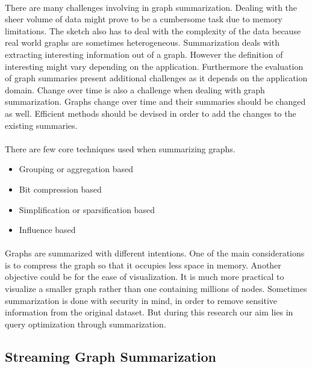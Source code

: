\paragraph{}
There are many challenges involving in graph summarization. Dealing with the sheer volume of data might prove to be a cumbersome task due to memory limitations. The sketch also has to deal with the complexity of the data because real world graphs are sometimes heterogeneous. Summarization deals with extracting interesting information out of a graph. However the definition of interesting might vary depending on the application. Furthermore the evaluation of graph summaries present additional challenges as it depends on the application domain. Change over time is also a challenge when dealing with graph summarization. Graphs change over time and their summaries should be changed as well. Efficient methods should be devised in order to add the changes to the existing summaries. 

\paragraph{}
There are few core techniques used when summarizing graphs\cite{liu_graph_2018}.
\begin{itemize}
    \item Grouping or aggregation based
    \item Bit compression based
    \item Simplification or sparsification based
    \item Influence based
\end{itemize}

\paragraph{}
Graphs are summarized with different intentions. One of the main considerations is to compress the graph so that it occupies less space in memory. Another objective could be for the ease of visualization. It is much more practical to visualize a smaller graph rather than one containing millions of nodes. Sometimes summarization is done with security in mind, in order to remove sensitive information from the original dataset. But during this research our aim lies in query optimization through summarization. 

\subsection{Streaming Graph Summarization}

